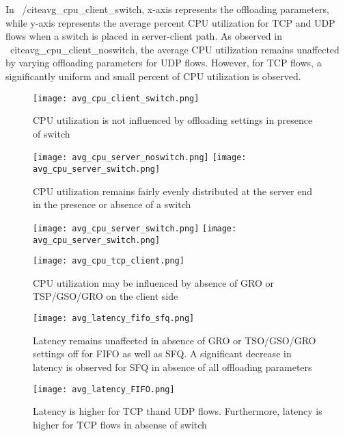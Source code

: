 In ~/cite{avg_cpu_client_switch}, x-axis represents the offloading parameters,
   while y-axis represents the average percent CPU utilization for TCP and UDP
   flows when a switch is placed in server-client path. As observed in
   ~cite{avg_cpu_client_noswitch}, the average CPU utilization remains
   unaffected by varying offloading parameters for UDP flows. However, for TCP
   flows, a significantly uniform and small percent of CPU utilization is
   observed. 
\begin{figure}[t] 
\texttt{[image: avg\_cpu\_client\_switch.png]}
\caption{CPU utilization is not influenced by offloading settings in presence of
    switch} 
\label{fig:avg_cpu_client_switch} 
\end{figure}


\begin{figure}[t] \texttt{[image: avg\_cpu\_server\_noswitch.png]}
\texttt{[image: avg\_cpu\_server\_switch.png]} \caption{CPU utilization
    remains fairly evenly distributed at the server end in the presence or
        absence of a switch} \label{fig:avg_cpu_server_noswitch} \end{figure}

\begin{figure}[t] \texttt{[image: avg\_cpu\_server\_switch.png]}
\texttt{[image: avg\_cpu\_server\_switch.png]} \caption{
} \label{fig:avg_cpu_server_switch} \end{figure}

\begin{figure}[t] \texttt{[image: avg\_cpu\_tcp\_client.png]}
\caption{CPU utilization may be influenced by absence of GRO or TSP/GSO/GRO on
    the client side} \label{fig:avg_cpu_tcp_client} \end{figure}

\begin{figure}[t] \texttt{[image: avg\_latency\_fifo\_sfq.png]}
\caption{Latency remains unaffected in absence of GRO or TSO/GSO/GRO settings
    off for FIFO as well as SFQ. A significant decrease in latency is observed
        for SFQ in absence of all offloading parameters}
        \label{fig:avg_latency_fifo_sfq} \end{figure}


\begin{figure}[t] \texttt{[image: avg\_latency\_FIFO.png]}
\caption{Latency is higher for TCP thand UDP flows. Furthermore, latency is
    higher for TCP flows in absense of switch} \label{fig:avg_latency_FIFO}
    \end{figure}


